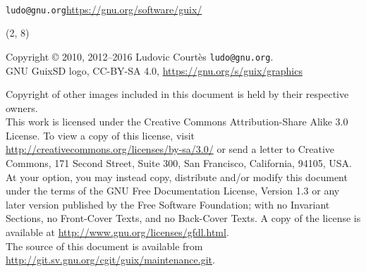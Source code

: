 \documentclass{beamer}
\begin{document}
\begin{frame}[plain]

\vfill{
  \vspace{2.5cm}
  \\[1.0cm]
  \texttt{ludo@gnu.org}\hfill{\alert{\url{https://gnu.org/software/guix/}}}
}

\end{frame}

\begin{frame}{}

  \begin{textblock}{12}(2, 8)
    \tiny{
      Copyright \copyright{} 2010, 2012--2016 Ludovic Courtès \texttt{ludo@gnu.org}.\\[3.0mm]
      GNU GuixSD logo, CC-BY-SA 4.0, \url{https://gnu.org/s/guix/graphics}

      Copyright of other images included in this document is held by
      their respective owners.
      \\[3.0mm]
      This work is licensed under the \alert{Creative Commons
        Attribution-Share Alike 3.0} License.  To view a copy of this
      license, visit
      \url{http://creativecommons.org/licenses/by-sa/3.0/} or send a
      letter to Creative Commons, 171 Second Street, Suite 300, San
      Francisco, California, 94105, USA.
      \\[2.0mm]
      At your option, you may instead copy, distribute and/or modify
      this document under the terms of the \alert{GNU Free Documentation
        License, Version 1.3 or any later version} published by the Free
      Software Foundation; with no Invariant Sections, no Front-Cover
      Texts, and no Back-Cover Texts.  A copy of the license is
      available at \url{http://www.gnu.org/licenses/gfdl.html}.
      \\[2.0mm]
      The source of this document is available from
      \url{http://git.sv.gnu.org/cgit/guix/maintenance.git}.
    }
  \end{textblock}
\end{frame}
\end{document}

